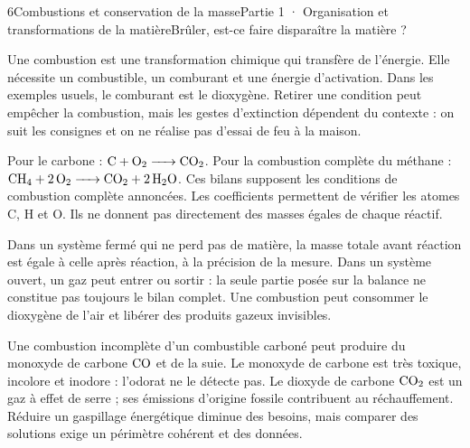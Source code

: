 \begin{ouverture}[college1]{6}{Combustions et conservation de la masse}{Partie 1 · Organisation et transformations de la matière}{Brûler, est-ce faire disparaître la matière ?}
\end{ouverture}
\label{ess-6}
Une combustion est une transformation chimique qui transfère de l’énergie. Elle nécessite un combustible, un comburant et une énergie d’activation. Dans les exemples usuels, le comburant est le dioxygène. Retirer une condition peut empêcher la combustion, mais les gestes d’extinction dépendent du contexte : on suit les consignes et on ne réalise pas d’essai de feu à la maison.\par
{}
Pour le carbone : $\ce{C + O2 -> CO2}$. Pour la combustion complète du méthane : $\ce{CH4 + 2O2 -> CO2 + 2H2O}$. Ces bilans supposent les conditions de combustion complète annoncées. Les coefficients permettent de vérifier les atomes C, H et O. Ils ne donnent pas directement des masses égales de chaque réactif.\par
\clearpage
{}
Dans un système fermé qui ne perd pas de matière, la masse totale avant réaction est égale à celle après réaction, à la précision de la mesure. Dans un système ouvert, un gaz peut entrer ou sortir : la seule partie posée sur la balance ne constitue pas toujours le bilan complet. Une combustion peut consommer le dioxygène de l’air et libérer des produits gazeux invisibles.\par
{}
Une combustion incomplète d’un combustible carboné peut produire du monoxyde de carbone $\ce{CO}$ et de la suie. Le monoxyde de carbone est très toxique, incolore et inodore : l’odorat ne le détecte pas. Le dioxyde de carbone $\ce{CO2}$ est un gaz à effet de serre ; ses émissions d’origine fossile contribuent au réchauffement. Réduire un gaspillage énergétique diminue des besoins, mais comparer des solutions exige un périmètre cohérent et des données.\par
